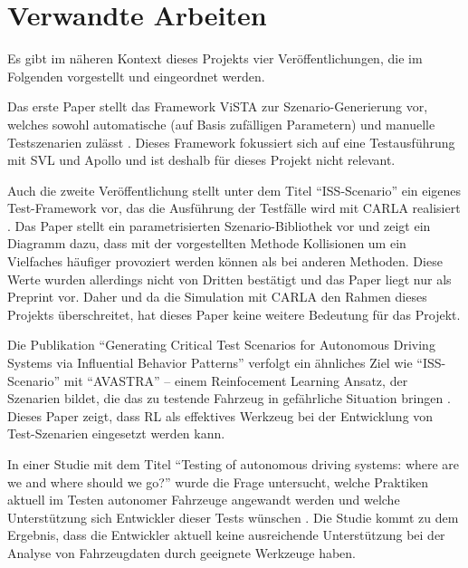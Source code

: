 \chapter{Verwandte Arbeiten}

Es gibt im näheren Kontext dieses Projekts vier Veröffentlichungen, die im Folgenden vorgestellt und eingeordnet werden.

Das erste Paper stellt das Framework ViSTA zur Szenario-Generierung vor, welches sowohl automatische (auf Basis zufälligen Parametern) und manuelle Testszenarien zulässt \cite{ViSTA}. Dieses Framework fokussiert sich auf eine Testausführung mit SVL und Apollo und ist deshalb für dieses Projekt nicht relevant.

Auch die zweite Veröffentlichung stellt unter dem Titel \enquote{ISS-Scenario} ein eigenes Test-Framework vor, das die Ausführung der Testfälle wird mit CARLA realisiert \cite{li2024issscenarioscenariobasedtestingcarla}. Das Paper stellt ein parametrisierten Szenario-Bibliothek vor und zeigt ein Diagramm dazu, dass mit der vorgestellten Methode Kollisionen um ein Vielfaches häufiger provoziert werden können als bei anderen Methoden. Diese Werte wurden allerdings nicht von Dritten bestätigt und das Paper liegt nur als Preprint vor. Daher und da die Simulation mit CARLA den Rahmen dieses Projekts überschreitet, hat dieses Paper keine weitere Bedeutung für das Projekt.

Die Publikation \enquote{Generating Critical Test Scenarios for Autonomous Driving Systems via Influential Behavior Patterns} verfolgt ein ähnliches Ziel wie \enquote{ISS-Scenario} mit \enquote{AVASTRA} -- einem Reinfocement Learning Ansatz, der Szenarien bildet, die das zu testende Fahrzeug in gefährliche Situation bringen \cite{GeneratingCritialTestScenarios}. Dieses Paper zeigt, dass RL als effektives Werkzeug bei der Entwicklung von Test-Szenarien eingesetzt werden kann.

In einer Studie mit dem Titel \enquote{Testing of autonomous driving systems: where are we and where should we go?} wurde die Frage untersucht, welche Praktiken aktuell im Testen autonomer Fahrzeuge angewandt werden und welche Unterstützung sich Entwickler dieser Tests wünschen \cite{WhereShouldWeGo}. Die Studie kommt zu dem Ergebnis, dass die Entwickler aktuell keine ausreichende Unterstützung bei der Analyse von Fahrzeugdaten durch geeignete Werkzeuge haben.

